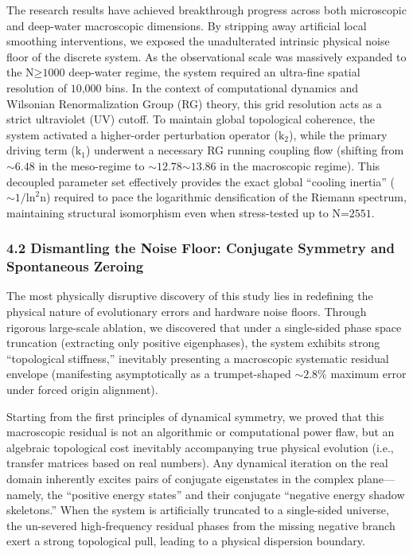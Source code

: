 The research results have achieved breakthrough progress across both
microscopic and deep-water macroscopic dimensions. By stripping away
artificial local smoothing interventions, we exposed the unadulterated
intrinsic physical noise floor of the discrete system. As the
observational scale was massively expanded to the
\(\text{N}\text{≥1000}\) deep-water regime, the system required an
ultra-fine spatial resolution of \(\text{10,000}\) bins. In the context
of computational dynamics and Wilsonian Renormalization Group (RG)
theory, this grid resolution acts as a strict ultraviolet (UV) cutoff.
To maintain global topological coherence, the system activated a
higher-order perturbation operator (\(\text{k}_{\text{2}}\)), while the
primary driving term (\(\text{k}_{\text{1}}\)) underwent a necessary RG
running coupling flow (shifting from \(\text{∼6.48}\) in the meso-regime
to \(\text{∼12.78∼13.86}\) in the macroscopic regime). This decoupled
parameter set effectively provides the exact global ``cooling inertia''
(\(\text{∼1/}\text{ln}^{\text{2}}\text{n}\)) required to pace the
logarithmic densification of the Riemann spectrum, maintaining
structural isomorphism even when stress-tested up to
\(\text{N}\text{=2551}\).

\hypertarget{dismantling-the-noise-floor-conjugate-symmetry-and-spontaneous-zeroing}{%
\subsubsection{\texorpdfstring{\textbf{4.2 Dismantling the Noise Floor:
Conjugate Symmetry and Spontaneous
Zeroing}}{4.2 Dismantling the Noise Floor: Conjugate Symmetry and Spontaneous Zeroing}}\label{dismantling-the-noise-floor-conjugate-symmetry-and-spontaneous-zeroing}}

The most physically disruptive discovery of this study lies in
redefining the physical nature of evolutionary errors and hardware noise
floors. Through rigorous large-scale ablation, we discovered that under
a single-sided phase space truncation (extracting only positive
eigenphases), the system exhibits strong ``topological stiffness,''
inevitably presenting a macroscopic systematic residual envelope
(manifesting asymptotically as a trumpet-shaped \(\text{∼2.8\%}\)
maximum error under forced origin alignment).

Starting from the first principles of dynamical symmetry, we proved that
this macroscopic residual is not an algorithmic or computational power
flaw, but an algebraic topological cost inevitably accompanying true
physical evolution (i.e., transfer matrices based on real numbers). Any
dynamical iteration on the real domain inherently excites pairs of
conjugate eigenstates in the complex plane---namely, the ``positive
energy states'' and their conjugate ``negative energy shadow
skeletons.'' When the system is artificially truncated to a single-sided
universe, the un-severed high-frequency residual phases from the missing
negative branch exert a strong topological pull, leading to a physical
dispersion boundary.


